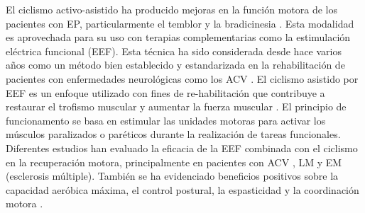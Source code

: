El ciclismo activo-asistido ha producido mejoras en la función motora de los pacientes con EP, particularmente el temblor y la bradicinesia \cite{ryan2020interval, palomino2021efectividad}. Esta modalidad es aprovechada para su uso con terapias complementarias como la estimulación eléctrica funcional (EEF). Esta técnica ha sido considerada desde hace varios años como un método bien establecido y estandarizada en la rehabilitación de pacientes con enfermedades neurológicas como los ACV \cite{rabelo2018overview}. El ciclismo asistido por EEF es un enfoque utilizado con fines de re-habilitación que contribuye a restaurar el trofismo muscular y aumentar la fuerza muscular \cite{barbosa2015application, ferrante2008cycling}. El principio de funcionamento se basa en estimular las unidades motoras para activar los músculos paralizados o paréticos durante la realización de tareas funcionales. Diferentes estudios han evaluado la eficacia de la EEF combinada con el ciclismo en la recuperación motora, principalmente en pacientes con ACV \cite{ambrosini2020does}, LM \cite{casabona2020effects} y EM (esclerosis múltiple)\cite{pilutti2019functional}. También se ha evidenciado beneficios positivos sobre la capacidad aeróbica máxima, el control postural, la espasticidad y la
coordinación motora \cite{barbosa2015application, rabelo2018overview}.
